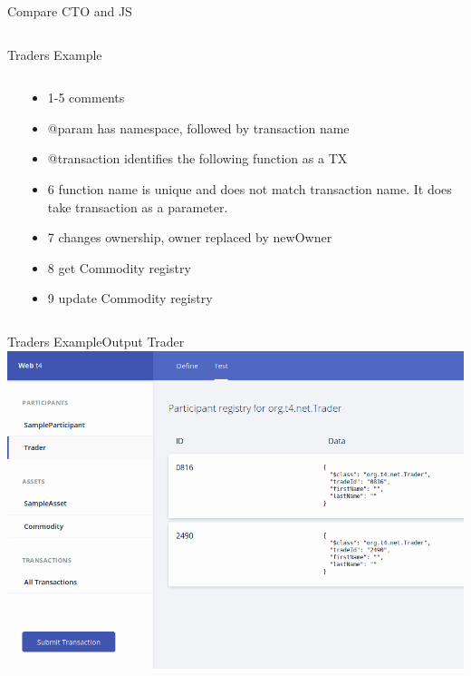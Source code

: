 \documentclass[pdf,table]{beamer}
\begin{document}
\begin{frame}{Compare CTO and JS}
	\begin{columns}[T]
		\begin{column}{0.48\textwidth}
			
		\end{column}
		\begin{column}{0.48\textwidth}
			
		\end{column}
	\end{columns}	
\end{frame}


\begin{frame}{Traders Example}
	\begin{columns}[T]
		\begin{column}{0.5\textwidth}
			
		\end{column}
		\begin{column}{0.5\textwidth}
			\small
			\begin{itemize}
				\item 1-5 comments
				\item @param has namespace, followed by transaction name
				\item @transaction identifies the following function as a TX
				\item 6 function name is unique and does not match transaction name. It does take transaction as a parameter.
				\item 7 changes ownership, owner replaced by newOwner
				\item 8 get Commodity registry
				\item 9 update Commodity registry
			\end{itemize}
		\end{column}
	\end{columns}	
\end{frame}

\begin{frame}{Traders Example}{Output Trader}
	\includegraphics[scale=0.35]{t4-Trader}
\end{frame}
\end{document}
